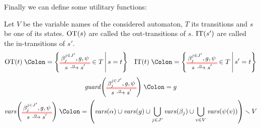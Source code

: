 \documentclass{article}
\begin{document}
Finally we can define some utilitary functions:
\begin{defi}
Let \(V\) be the variable names of the considered automaton, \(T\) its transitions and \(s\) be one of its states.
\(\mathrm{OT}{\left(s\right)}\) are called the out-transitions of \(s\).
\(\mathrm{IT}{\left(s'\right)}\) are called the in-transitions of \(s'\).
\begin{align*}
	\fOT{t} & \defnotation \mset{\OTg \in T}{s = t} &
	\fIT{t} & \defnotation \mset{\OTg \in T}{s' = t} \\
\end{align*}
\vspace{-1cm}
\begin{gather*}
	\fguard{\OTg} \defnotation g \\
	\fvars{\OTg} \defnotation \mpar{\fvars{\alpha} \cup \fvars{g} \cup \bigcup_{j \in J'} \fvars{\beta_j} \cup \bigcup_{v \in V} \fvars{\psi\mpar{v}}} \setminus V
\end{gather*}
\end{defi}
\end{document}
